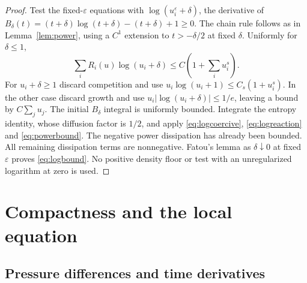 \documentclass[11pt]{article}
\newcommand{\eps}{\varepsilon}
\begin{document}
\begin{proof}
Test the fixed-$\eps$ equations with $\log(u_i^\eps+\delta)$, the derivative
of $B_\delta(t)=(t+\delta)\log(t+\delta)-(t+\delta)+1\geq0$.
The chain rule follows as in Lemma~\ref{lem:power}, using a $C^1$ extension
to $t>-\delta/2$ at fixed $\delta$. Uniformly for $\delta\leq1$,
\begin{equation}\label{eq:logreaction}
 \sum_iR_i(u)\log(u_i+\delta)\leq C(1+\sum_i u_i^s).
\end{equation}
For $u_i+\delta\geq1$ discard competition and use
$u_i\log(u_i+1)\leq C_s(1+u_i^s)$. In the other case discard growth and
use $u_i|\log(u_i+\delta)|\leq1/e$, leaving a bound by $C\sum_j u_j$.
The initial $B_\delta$ integral is uniformly bounded. Integrate the entropy
identity, whose diffusion factor is $1/2$, and apply
\eqref{eq:logcoercive}, \eqref{eq:logreaction} and \eqref{eq:powerbound}.
The negative power dissipation has already been bounded. All remaining
dissipation terms are nonnegative. Fatou's lemma as $\delta\downarrow0$
at fixed $\eps$ proves \eqref{eq:logbound}. No positive density floor or
test with an unregularized logarithm at zero is used.
\end{proof}

\section{Compactness and the local equation}\label{sec:limit}

\subsection{Pressure differences and time derivatives}
\end{document}
